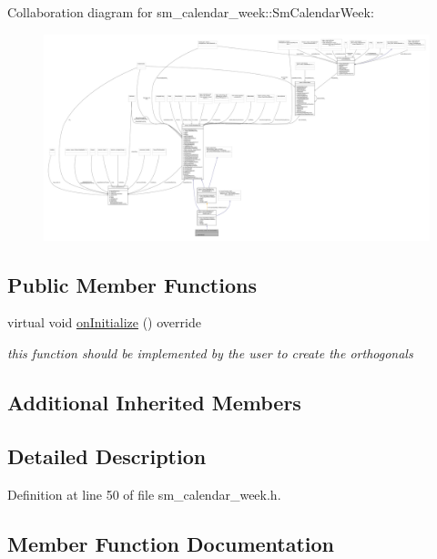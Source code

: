 Collaboration diagram for sm\+\_\+calendar\+\_\+week\+:\+:Sm\+Calendar\+Week\+:
\nopagebreak
\begin{figure}[H]
\begin{center}
\leavevmode
\includegraphics[width=350pt]{structsm__calendar__week_1_1SmCalendarWeek__coll__graph}
\end{center}
\end{figure}
\subsection*{Public Member Functions}
\begin{DoxyCompactItemize}
\item 
virtual void \hyperlink{structsm__calendar__week_1_1SmCalendarWeek_a4c01af9a3190d10d3794e82bd087e121}{on\+Initialize} () override
\begin{DoxyCompactList}\small\item\em this function should be implemented by the user to create the orthogonals \end{DoxyCompactList}\end{DoxyCompactItemize}
\subsection*{Additional Inherited Members}


\subsection{Detailed Description}


Definition at line 50 of file sm\+\_\+calendar\+\_\+week.\+h.



\subsection{Member Function Documentation}
\mbox{\label{structsm__calendar__week_1_1SmCalendarWeek_a4c01af9a3190d10d3794e82bd087e121}} 

